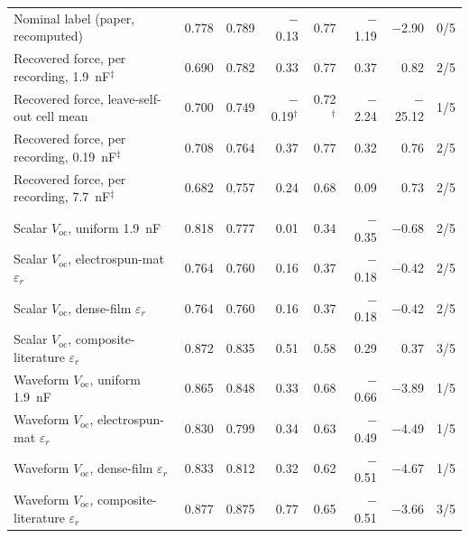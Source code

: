 \begin{tabular}{l rr rr rr r}
Nominal label (paper, recomputed) & 0.778 & 0.789 & $-$0.13 & 0.77 & $-$1.19 & $-$2.90 & 0/5 \\
Recovered force, per recording, \SI{1.9}{\nano\farad}$^\ddagger$ & 0.690 & 0.782 & 0.33 & 0.77 & 0.37 & 0.82 & 2/5 \\
Recovered force, leave-self-out cell mean & 0.700 & 0.749 & $-$0.19$^\dagger$ & 0.72$^\dagger$ & $-$2.24 & $-$25.12 & 1/5 \\
Recovered force, per recording, \SI{0.19}{\nano\farad}$^\ddagger$ & 0.708 & 0.764 & 0.37 & 0.77 & 0.32 & 0.76 & 2/5 \\
Recovered force, per recording, \SI{7.7}{\nano\farad}$^\ddagger$ & 0.682 & 0.757 & 0.24 & 0.68 & 0.09 & 0.73 & 2/5 \\
Scalar $V_\mathrm{oc}$, uniform \SI{1.9}{\nano\farad} & 0.818 & 0.777 & 0.01 & 0.34 & $-$0.35 & $-$0.68 & 2/5 \\
Scalar $V_\mathrm{oc}$, electrospun-mat $\varepsilon_r$ & 0.764 & 0.760 & 0.16 & 0.37 & $-$0.18 & $-$0.42 & 2/5 \\
Scalar $V_\mathrm{oc}$, dense-film $\varepsilon_r$ & 0.764 & 0.760 & 0.16 & 0.37 & $-$0.18 & $-$0.42 & 2/5 \\
Scalar $V_\mathrm{oc}$, composite-literature $\varepsilon_r$ & 0.872 & 0.835 & 0.51 & 0.58 & 0.29 & 0.37 & 3/5 \\
Waveform $V_\mathrm{oc}$, uniform \SI{1.9}{\nano\farad} & 0.865 & 0.848 & 0.33 & 0.68 & $-$0.66 & $-$3.89 & 1/5 \\
Waveform $V_\mathrm{oc}$, electrospun-mat $\varepsilon_r$ & 0.830 & 0.799 & 0.34 & 0.63 & $-$0.49 & $-$4.49 & 1/5 \\
Waveform $V_\mathrm{oc}$, dense-film $\varepsilon_r$ & 0.833 & 0.812 & 0.32 & 0.62 & $-$0.51 & $-$4.67 & 1/5 \\
Waveform $V_\mathrm{oc}$, composite-literature $\varepsilon_r$ & 0.877 & 0.875 & 0.77 & 0.65 & $-$0.51 & $-$3.66 & 3/5 \\
\bottomrule
\end{tabular}
